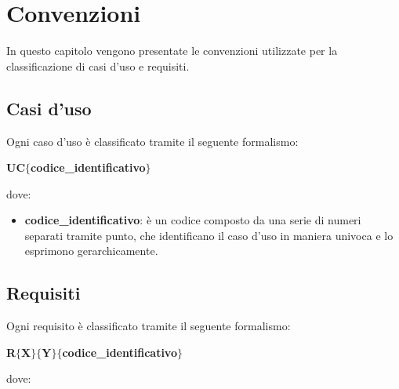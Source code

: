 \chapter{Convenzioni} \label{convenzioni}

In questo capitolo vengono presentate le convenzioni utilizzate per la classificazione di casi d'uso e requisiti.

\section{Casi d'uso}

Ogni caso d'uso è classificato tramite il seguente formalismo:

                \begin{center}
                    \textbf{UC$\{$codice\_identificativo$\}$}
                \end{center}

            dove:

                \begin{itemize}
                    \item \textbf{codice\_identificativo}: è un codice composto da una serie di numeri separati tramite
                    punto, che identificano il caso d'uso in maniera univoca e lo esprimono gerarchicamente.
                \end{itemize}

\section{Requisiti}

Ogni requisito è classificato tramite il seguente formalismo:

                \begin{center}
                    \textbf{R$\{$X$\}$$\{$Y$\}$$\{$codice\_identificativo$\}$}
                \end{center}

            dove:

